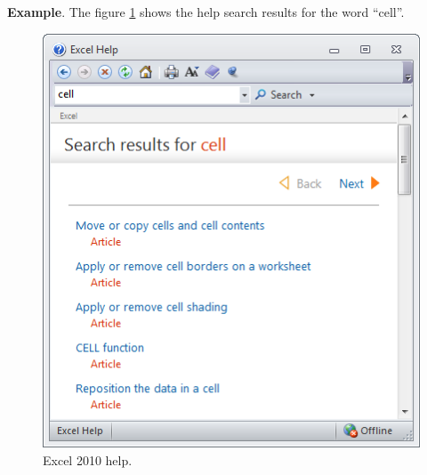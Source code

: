 \textbf{Example}. The figure \ref{img-excel_2010_help} shows the help search results for the word ``cell''.

\begin{figure}[htbp]
\begin{center}
\includegraphics[scale=0.7]{../img/excel_2010_help.png}
\end{center}
\caption{Excel 2010 help.}
\label{img-excel_2010_help}
\end{figure}

